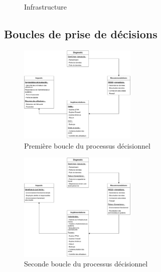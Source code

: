 \clearpage
{}
\thispagestyle{empty} %
\begin{figure}[ht!]
    
    \label{infra}
    \caption{Infrastructure}
\end{figure}
\restoregeometry %
\pagestyle{fancy}
\clearpage

\subsection*{Boucles de prise de décisions}
\begin{figure}[ht!]
    \centering
    \includegraphics[width=0.5\textwidth]{paper/figures/boucle1.pdf}
    \caption{Première boucle du processus décisionnel}
    \label{fig:boucle1}
\end{figure}

\begin{figure}[ht!]
    \centering
    \includegraphics[width=0.5\textwidth]{paper/figures/boucle2.pdf}
    \caption{Seconde boucle du processus décisionnel}
    \label{fig:boucle2}
\end{figure}
